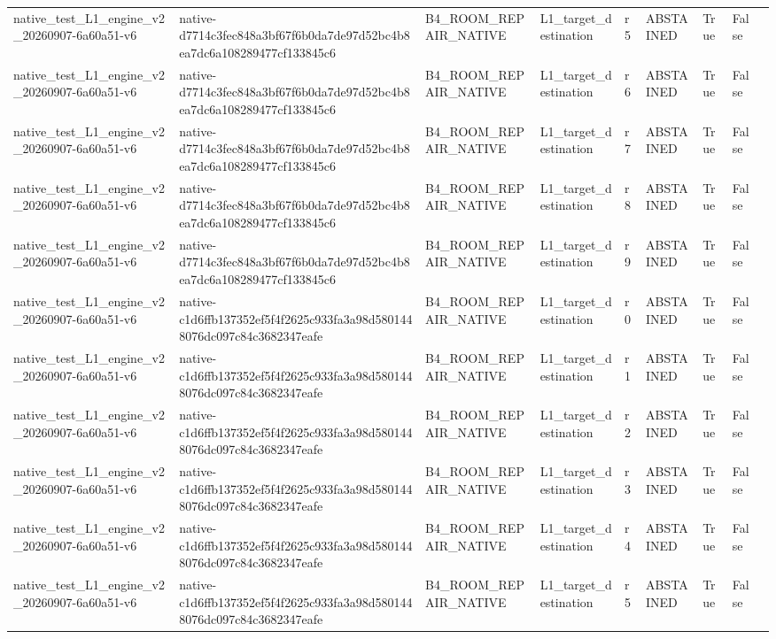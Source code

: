 \begin{tabular}{lllllllll}
native\_test\_L1\_engine\_v2\_20260907-6a60a51-v6 & native-d7714c3fec848a3bf67f6b0da7de97d52bc4b8ea7dc6a108289477cf133845c6 & B4\_ROOM\_REPAIR\_NATIVE & L1\_target\_destination & r5 & ABSTAINED & True & False &  \\
native\_test\_L1\_engine\_v2\_20260907-6a60a51-v6 & native-d7714c3fec848a3bf67f6b0da7de97d52bc4b8ea7dc6a108289477cf133845c6 & B4\_ROOM\_REPAIR\_NATIVE & L1\_target\_destination & r6 & ABSTAINED & True & False &  \\
native\_test\_L1\_engine\_v2\_20260907-6a60a51-v6 & native-d7714c3fec848a3bf67f6b0da7de97d52bc4b8ea7dc6a108289477cf133845c6 & B4\_ROOM\_REPAIR\_NATIVE & L1\_target\_destination & r7 & ABSTAINED & True & False &  \\
native\_test\_L1\_engine\_v2\_20260907-6a60a51-v6 & native-d7714c3fec848a3bf67f6b0da7de97d52bc4b8ea7dc6a108289477cf133845c6 & B4\_ROOM\_REPAIR\_NATIVE & L1\_target\_destination & r8 & ABSTAINED & True & False &  \\
native\_test\_L1\_engine\_v2\_20260907-6a60a51-v6 & native-d7714c3fec848a3bf67f6b0da7de97d52bc4b8ea7dc6a108289477cf133845c6 & B4\_ROOM\_REPAIR\_NATIVE & L1\_target\_destination & r9 & ABSTAINED & True & False &  \\
native\_test\_L1\_engine\_v2\_20260907-6a60a51-v6 & native-c1d6ffb137352ef5f4f2625c933fa3a98d5801448076dc097c84c3682347eafe & B4\_ROOM\_REPAIR\_NATIVE & L1\_target\_destination & r0 & ABSTAINED & True & False &  \\
native\_test\_L1\_engine\_v2\_20260907-6a60a51-v6 & native-c1d6ffb137352ef5f4f2625c933fa3a98d5801448076dc097c84c3682347eafe & B4\_ROOM\_REPAIR\_NATIVE & L1\_target\_destination & r1 & ABSTAINED & True & False &  \\
native\_test\_L1\_engine\_v2\_20260907-6a60a51-v6 & native-c1d6ffb137352ef5f4f2625c933fa3a98d5801448076dc097c84c3682347eafe & B4\_ROOM\_REPAIR\_NATIVE & L1\_target\_destination & r2 & ABSTAINED & True & False &  \\
native\_test\_L1\_engine\_v2\_20260907-6a60a51-v6 & native-c1d6ffb137352ef5f4f2625c933fa3a98d5801448076dc097c84c3682347eafe & B4\_ROOM\_REPAIR\_NATIVE & L1\_target\_destination & r3 & ABSTAINED & True & False &  \\
native\_test\_L1\_engine\_v2\_20260907-6a60a51-v6 & native-c1d6ffb137352ef5f4f2625c933fa3a98d5801448076dc097c84c3682347eafe & B4\_ROOM\_REPAIR\_NATIVE & L1\_target\_destination & r4 & ABSTAINED & True & False &  \\
native\_test\_L1\_engine\_v2\_20260907-6a60a51-v6 & native-c1d6ffb137352ef5f4f2625c933fa3a98d5801448076dc097c84c3682347eafe & B4\_ROOM\_REPAIR\_NATIVE & L1\_target\_destination & r5 & ABSTAINED & True & False &  \\

\end{tabular}
